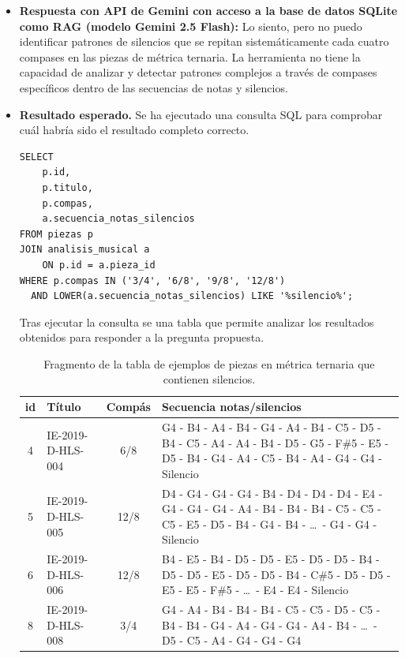 \begin{itemize}
Recuerda que estos métodos pueden no ser suficientes para detectar patrones complejos o subyacentes, y es posible que necesites aplicar técnicas más avanzadas de análisis musical para encontrar la respuesta a tu pregunta."
\item \textbf{Respuesta con API de Gemini con acceso a la base de datos SQLite como RAG (modelo Gemini 2.5 Flash):} Lo siento, pero no puedo identificar patrones de silencios que se repitan sistemáticamente cada cuatro compases en las piezas de métrica ternaria. La herramienta no tiene la capacidad de analizar y detectar patrones complejos a través de compases específicos dentro de las secuencias de notas y silencios.
    \item \textbf{Resultado esperado.} Se ha ejecutado una consulta SQL para comprobar cuál habría sido el resultado completo correcto.
    \begin{verbatim}
SELECT
    p.id,
    p.titulo,
    p.compas,
    a.secuencia_notas_silencios
FROM piezas p
JOIN analisis_musical a
    ON p.id = a.pieza_id
WHERE p.compas IN ('3/4', '6/8', '9/8', '12/8')
  AND LOWER(a.secuencia_notas_silencios) LIKE '%silencio%';
    \end{verbatim}    
    Tras ejecutar la consulta se una tabla que permite analizar los resultados obtenidos para responder a la pregunta propuesta.

    \begin{table}[htbp]
\centering
\footnotesize
\begin{tabular}{|c|p{3.5cm}|c|p{8cm}|}
\hline
\textbf{id} & \textbf{Título} & \textbf{Compás} & \textbf{Secuencia notas/silencios} \\
\hline
4 &
IE-2019-D-HLS-004 &
6/8 &
G4 - B4 - A4 - B4 - G4 - A4 - B4 - C5 - D5 - B4 - C5 - A4 - A4 - B4 - D5 - G5 - F\#5 - E5 - D5 - B4 - G4 - A4 - C5 - B4 - A4 - G4 - G4 - Silencio \\
\hline
5 &
IE-2019-D-HLS-005 &
12/8 &
D4 - G4 - G4 - G4 - B4 - D4 - D4 - D4 - E4 - G4 - G4 - G4 - A4 - B4 - B4 - B4 - C5 - C5 - C5 - E5 - D5 - B4 - G4 - B4 - \dots\ - G4 - G4 - Silencio \\
\hline
6 &
IE-2019-D-HLS-006 &
12/8 &
B4 - E5 - B4 - D5 - D5 - E5 - D5 - D5 - B4 - D5 - D5 - E5 - D5 - D5 - B4 - C\#5 - D5 - D5 - E5 - E5 - F\#5 - \dots\ - E4 - E4 - Silencio \\
\hline
8 &
IE-2019-D-HLS-008 &
3/4 &
G4 - A4 - B4 - B4 - B4 - C5 - C5 - D5 - C5 - B4 - B4 - G4 - A4 - G4 - G4 - A4 - B4 - \dots\ - D5 - C5 - A4 - G4 - G4 - G4 \\
\hline
\end{tabular}
\caption{Fragmento de la tabla de ejemplos de piezas en métrica ternaria que contienen silencios.}
\label{tab:silencios_metrica_ternaria}
\end{table}


\end{itemize}
